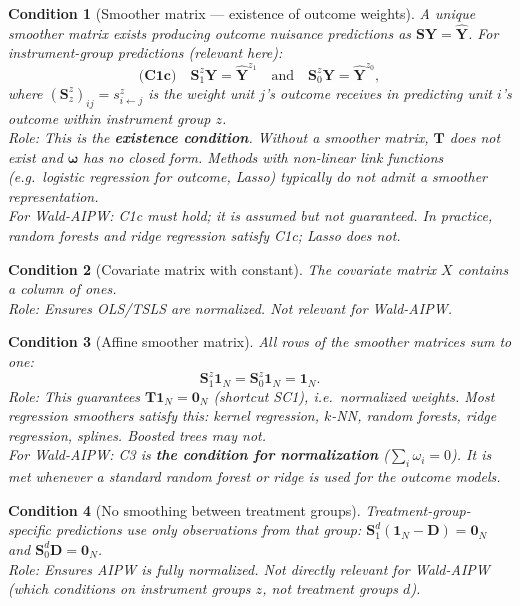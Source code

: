 \documentclass[12pt, a4paper]{article}
\theoremstyle{condstyle}
\newtheorem{condition}{Condition}
\theoremstyle{plain}
\newcommand{\bone}{\mathbf{1}_N}
\newcommand{\bzero}{\mathbf{0}_N}
\newcommand{\bD}{\mathbf{D}}
\newcommand{\bY}{\mathbf{Y}}
\newcommand{\Yhz}[1]{\hat{\mathbf{Y}}^{z_{#1}}}   %
\newcommand{\Sz}[1]{\mathbf{S}^{z}_{#1}}           %
\begin{document}
\begin{condition}[Smoother matrix --- existence of outcome weights]\label{cond:C1}
A unique smoother matrix exists producing outcome nuisance predictions as
$\mathbf{S}\bY=\hat{\mathbf{Y}}$. For instrument-group predictions (relevant here):
\begin{equation}
  \textbf{(C1c)}\quad \Sz{1}\bY = \Yhz{1} \quad\text{and}\quad \Sz{0}\bY = \Yhz{0},
  \label{eq:C1c}
\end{equation}
where $(\Sz{z})_{ij} = s^z_{i\leftarrow j}$ is the weight unit $j$'s outcome
receives in predicting unit $i$'s outcome within instrument group $z$.\\[2pt]
\textit{Role:} This is the \textbf{existence condition}. Without a smoother matrix,
$\mathbf{T}$ does not exist and $\boldsymbol{\omega}$ has no closed form.
Methods with non-linear link functions (e.g.\ logistic regression for outcome,
Lasso) typically do not admit a smoother representation.\\[2pt]
\textit{For Wald-AIPW:} C1c must hold; it is assumed but not guaranteed.
In practice, random forests and ridge regression satisfy C1c; Lasso does not.
\end{condition}

\begin{condition}[Covariate matrix with constant]\label{cond:C2}
The covariate matrix $X$ contains a column of ones.\\[2pt]
\textit{Role:} Ensures OLS/TSLS are normalized. Not relevant for Wald-AIPW.
\end{condition}

\begin{condition}[Affine smoother matrix]\label{cond:C3}
All rows of the smoother matrices sum to one:
\begin{equation}
  \Sz{1}\bone = \Sz{0}\bone = \bone.
  \label{eq:C3}
\end{equation}
\textit{Role:} This guarantees $\mathbf{T}\bone = \bzero$ (shortcut SC1), i.e.\ normalized weights.
Most regression smoothers satisfy this: kernel regression, $k$-NN, random forests,
ridge regression, splines. Boosted trees may not.\\[2pt]
\textit{For Wald-AIPW:} C3 is \textbf{the condition for normalization} ($\sum_i\omega_i=0$).
It is met whenever a standard random forest or ridge is used for the outcome models.
\end{condition}

\begin{condition}[No smoothing between treatment groups]\label{cond:C4}
Treatment-group-specific predictions use only observations from that group:
$\mathbf{S}^d_1(\bone-\bD)=\bzero$ and $\mathbf{S}^d_0\bD=\bzero$.\\[2pt]
\textit{Role:} Ensures AIPW is fully normalized. Not directly relevant for Wald-AIPW
(which conditions on instrument groups $z$, not treatment groups $d$).
\end{condition}
\end{document}
